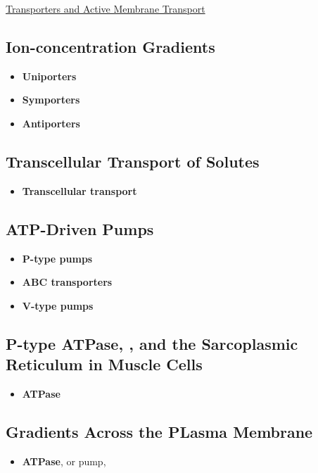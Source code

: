 \documentclass[12pt,letterpaper]{article}
\begin{document}
\hypertarget{11.2}{}
\begin{secbox}{\hyperlink{11}{Transporters and Active Membrane Transport}}{
    \hypertarget{11.2.1}{\subsection*{Ion-concentration Gradients}}
    \begin{itemize}
        \item \textbf{Uniporters}
        \item \textbf{Symporters}
        \item \textbf{Antiporters}
    \end{itemize}

    \hypertarget{11.2.2}{\subsection*{Transcellular Transport of Solutes}}
    \begin{itemize}
        \item \textbf{Transcellular transport}
    \end{itemize}

    \hypertarget{11.2.3}{\subsection*{ATP-Driven Pumps}}
    \begin{itemize}
        \item \textbf{P-type pumps}
        \item \textbf{ABC transporters}
        \item \textbf{V-type pumps}
    \end{itemize}
    
    \hypertarget{11.2.4}{\subsection*{P-type ATPase, , and the Sarcoplasmic Reticulum in Muscle Cells}}
    \begin{itemize}
        \item \textbf{ ATPase}
    \end{itemize}
    \hypertarget{11.2.5}{\subsection*{Gradients Across the PLasma Membrane}}
    \begin{itemize}
        \item \textbf{ ATPase}, or  pump,
    \end{itemize}
    
}
\end{secbox}
\end{document}
